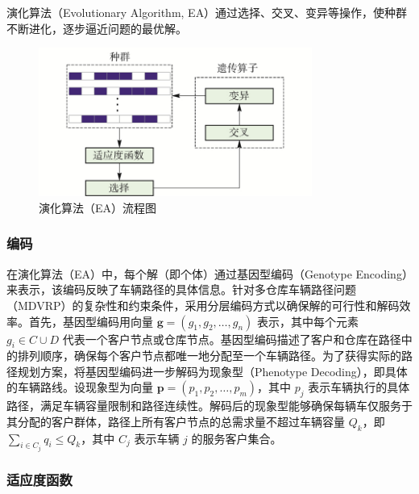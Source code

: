 \documentclass[12pt,a4paper,oneside]{ctexart}
\begin{document}
演化算法（Evolutionary Algorithm, EA）通过选择、交叉、变异等操作，使种群不断进化，逐步逼近问题的最优解。

\begin{figure}[htbp]
	\centering
	\includegraphics[width=0.8\textwidth]{fig/2.jpg}
	\caption{演化算法（EA）流程图}
	\label{fig:2}
\end{figure}

\subsubsection{编码}

在演化算法（EA）中，每个解（即个体）通过基因型编码（Genotype Encoding）来表示，该编码反映了车辆路径的具体信息。针对多仓库车辆路径问题（MDVRP）的复杂性和约束条件，采用分层编码方式以确保解的可行性和解码效率。首先，基因型编码用向量 $\bm{g} = (g_1, g_2, \ldots, g_n)$ 表示，其中每个元素 $g_i \in C \cup D$ 代表一个客户节点或仓库节点。基因型编码描述了客户和仓库在路径中的排列顺序，确保每个客户节点都唯一地分配至一个车辆路径。为了获得实际的路径规划方案，将基因型编码进一步解码为现象型（Phenotype Decoding），即具体的车辆路线。设现象型为向量 $\bm{p} = (p_1, p_2, \ldots, p_m)$，其中 $p_j$ 表示车辆执行的具体路径，满足车辆容量限制和路径连续性。解码后的现象型能够确保每辆车仅服务于其分配的客户群体，路径上所有客户节点的总需求量不超过车辆容量 $Q_k$，即 $\sum_{i \in C_j} q_i \leq Q_k$，其中 $C_j$ 表示车辆 $j$ 的服务客户集合。

\subsubsection{适应度函数}
\end{document}
